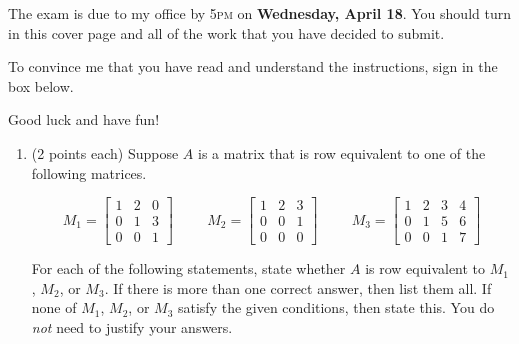 \documentclass[11pt]{article}
\theoremstyle{definition}
\begin{document}
The exam is due to my office by 5\textsc{pm} on \textbf{Wednesday, April 18}.  You should turn in this cover page and all of the work that you have decided to submit.

\bigskip

To convince me that you have read and understand the instructions, sign in the box below.

\bigskip


\bigskip

Good luck and have fun!

\newpage

\begin{enumerate}

\item (2 points each) Suppose $A$ is a matrix that is row equivalent to one of the following matrices.

\[M_1 = \begin{bmatrix}1 & 2 & 0 \\0 & 1 & 3 \\0 & 0 & 1\end{bmatrix} \hspace{1cm} M_2 = \begin{bmatrix}1 & 2 & 3 \\0 & 0 & 1 \\0 & 0 & 0\end{bmatrix}\hspace{1cm} M_3=\begin{bmatrix}1 & 2 & 3 & 4 \\0 & 1 & 5 & 6 \\0 & 0 & 1 & 7\end{bmatrix}\]

For each of the following statements, state whether $A$ is row equivalent to $M_1$, $M_2$, or $M_{3}$.  If there is more than one correct answer, then list them all.  If none of $M_1$, $M_2$, or $M_{3}$ satisfy the given conditions, then state this. You do \emph{not} need to justify your answers. 


\end{enumerate}
\end{document}

